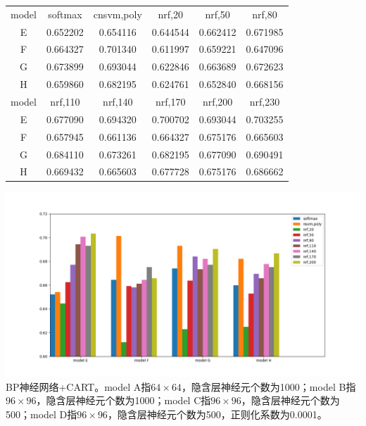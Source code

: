 \begin{center}
\begin{tabular}{cccccc}
\toprule[2pt] 
model & softmax  & cnsvm,poly & nrf,20 & nrf,50 & nrf,80 \\ 
E & 0.652202 & 0.654116 & 0.644544 & 0.662412 & 0.671985 \\ 
F & 0.664327 & 0.701340 & 0.611997 & 0.659221 & 0.647096 \\ 
G & 0.673899 & 0.693044 & 0.622846 & 0.663689 & 0.672623 \\ 
H & 0.659860 & 0.682195 & 0.624761 & 0.652840 & 0.668156 \\ 
\midrule[2pt]
model & nrf,110 & nrf,140 & nrf,170 & nrf,200 & nrf,230 \\ 
E & 0.677090 & 0.694320 & 0.700702 & 0.693044 & 0.703255 \\ 
F & 0.657945 & 0.661136 & 0.664327 & 0.675176 & 0.665603 \\  
G & 0.684110 & 0.673261 & 0.682195 & 0.677090 & 0.690491 \\ 
H & 0.669432 & 0.665603 & 0.677728 & 0.675176 & 0.686662 \\ 
\bottomrule[2pt]
\end{tabular} 
\end{center}


\begin{center}
\includegraphics[scale=0.5]{../figures/CNN_rf1.png} \\
BP神经网络+CART。model A指$64\times64$，隐含层神经元个数为1000；model B指$96\times96$，隐含层神经元个数为1000；model C指$96\times96$，隐含层神经元个数为500；model D指$96\times96$，隐含层神经元个数为500，正则化系数为0.0001。
\end{center}
